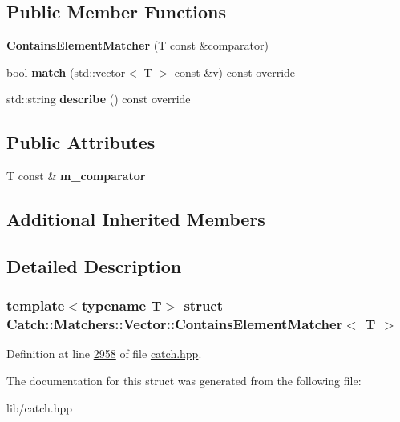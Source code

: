 \subsection*{Public Member Functions}
\begin{DoxyCompactItemize}
\item 
\mbox{\label{structCatch_1_1Matchers_1_1Vector_1_1ContainsElementMatcher_a6a05740b5d3f89fac8de84ac0cff7b93}} 
{\bfseries Contains\+Element\+Matcher} (T const \&comparator)
\item 
\mbox{\label{structCatch_1_1Matchers_1_1Vector_1_1ContainsElementMatcher_a6a4be6e5642e267433d370649beb0fac}} 
bool {\bfseries match} (std\+::vector$<$ T $>$ const \&v) const override
\item 
\mbox{\label{structCatch_1_1Matchers_1_1Vector_1_1ContainsElementMatcher_aea3b674389a0afd82af6ba4b10f86ae6}} 
std\+::string {\bfseries describe} () const override
\end{DoxyCompactItemize}
\subsection*{Public Attributes}
\begin{DoxyCompactItemize}
\item 
\mbox{\label{structCatch_1_1Matchers_1_1Vector_1_1ContainsElementMatcher_ab7eada6c4bbce1d21b44773262f9cb23}} 
T const  \& {\bfseries m\+\_\+comparator}
\end{DoxyCompactItemize}
\subsection*{Additional Inherited Members}


\subsection{Detailed Description}
\subsubsection*{template$<$typename T$>$\newline
struct Catch\+::\+Matchers\+::\+Vector\+::\+Contains\+Element\+Matcher$<$ T $>$}



Definition at line \mbox{\hyperlink{catch_8hpp_source_l02958}{2958}} of file \mbox{\hyperlink{catch_8hpp_source}{catch.\+hpp}}.



The documentation for this struct was generated from the following file\+:\begin{DoxyCompactItemize}
\item 
lib/catch.\+hpp\end{DoxyCompactItemize}
